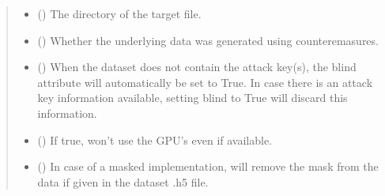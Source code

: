 \documentclass[letterpaper,10pt,english]{sphinxmanual}
\begin{document}
\begin{fulllineitems}
\begin{fulllineitems}
\begin{quote}
\begin{description}
\begin{itemize}
\item {} 
\sphinxAtStartPar
{} (\sphinxstyleliteralemphasis{\sphinxupquote{, }}) \textendash{} The directory of the target file.

\item {} 
\sphinxAtStartPar
{} (\sphinxstyleliteralemphasis{\sphinxupquote{, }}) \textendash{} Whether the underlying data was generated using counteremasures.

\item {} 
\sphinxAtStartPar
{} (\sphinxstyleliteralemphasis{\sphinxupquote{, }}) \textendash{} When the dataset does not contain the attack key(s), the blind attribute will automatically be set to True.
In case there is an attack key information available, setting blind to True will discard this information.

\item {} 
\sphinxAtStartPar
{} (\sphinxstyleliteralemphasis{\sphinxupquote{, }}) \textendash{} If true, won’t use the GPU’s even if available.

\item {} 
\sphinxAtStartPar
{} (\sphinxstyleliteralemphasis{\sphinxupquote{, }}) \textendash{} In case of a masked implementation, will remove the mask from the data if given in the dataset .h5 file.

\end{itemize}

\end{description}\end{quote}

\end{fulllineitems}



\end{fulllineitems}
\end{document}
